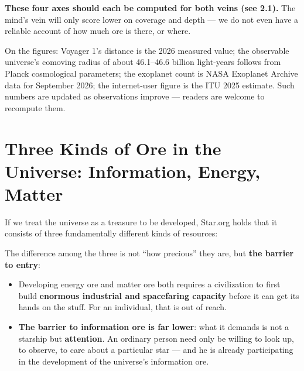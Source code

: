 \documentclass[11pt,fontset=none]{ctexart}
\begin{document}
\textbf{These four axes should each be computed for both veins (see 2.1).} The mind's vein will only score lower on coverage and depth --- we do not even have a reliable account of how much ore is there, or where.

{\small\color{inkfaint}
On the figures: Voyager 1's distance is the 2026 measured value; the observable universe's comoving radius of about 46.1--46.6 billion light-years follows from Planck cosmological parameters; the exoplanet count is NASA Exoplanet Archive data for September 2026; the internet-user figure is the ITU 2025 estimate. Such numbers are updated as observations improve — readers are welcome to recompute them.\par}

\section{Three Kinds of Ore in the Universe: Information, Energy, Matter}

If we treat the universe as a treasure to be developed, Star.org holds that it consists of three fundamentally different kinds of resources:


The difference among the three is not ``how precious'' they are, but \textbf{the barrier to entry}:

\begin{itemize}
  \item Developing energy ore and matter ore both requires a civilization to first build \textbf{enormous industrial and spacefaring capacity} before it can get its hands on the stuff. For an individual, that is out of reach.
  \item \textbf{The barrier to information ore is far lower}: what it demands is not a starship but \textbf{attention}. An ordinary person need only be willing to look up, to observe, to care about a particular star — and he is already participating in the development of the universe's information ore.
\end{itemize}
\end{document}

